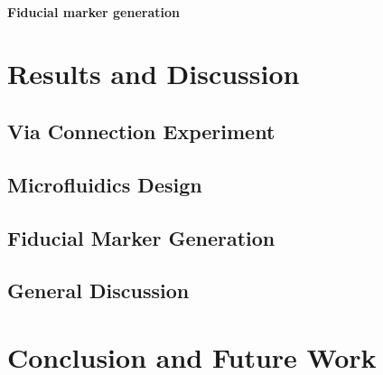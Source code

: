 \documentclass{article}
\begin{document}
\paragraph{Fiducial marker generation}

\section{Results and Discussion}
\subsection{Via Connection Experiment}

\subsection{Microfluidics Design}

\subsection{Fiducial Marker Generation}

\subsection{General Discussion}

\section{Conclusion and Future Work}

\printbibliography %
\end{document}
